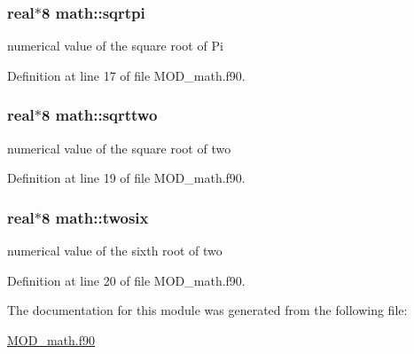 \hypertarget{classmath_acde39e7f34ffe785d3b7b1c6e7609a7c}{
\subsubsection[{sqrtpi}]{\setlength{\rightskip}{0pt plus 5cm}real$\ast$8 math\-::sqrtpi}}\label{classmath_acde39e7f34ffe785d3b7b1c6e7609a7c}


numerical value of the square root of Pi 



Definition at line 17 of file M\-O\-D\-\_\-math.\-f90.

\hypertarget{classmath_a7903363fd9938fb372dc41cb85238481}{
\subsubsection[{sqrttwo}]{\setlength{\rightskip}{0pt plus 5cm}real$\ast$8 math\-::sqrttwo}}\label{classmath_a7903363fd9938fb372dc41cb85238481}


numerical value of the square root of two 



Definition at line 19 of file M\-O\-D\-\_\-math.\-f90.

\hypertarget{classmath_a46e872c6d0df3ae0a736e5e25225ab71}{
\subsubsection[{twosix}]{\setlength{\rightskip}{0pt plus 5cm}real$\ast$8 math\-::twosix}}\label{classmath_a46e872c6d0df3ae0a736e5e25225ab71}


numerical value of the sixth root of two 



Definition at line 20 of file M\-O\-D\-\_\-math.\-f90.



The documentation for this module was generated from the following file\-:\begin{DoxyCompactItemize}
\item 
\hyperlink{MOD__math_8f90}{M\-O\-D\-\_\-math.\-f90}\end{DoxyCompactItemize}
